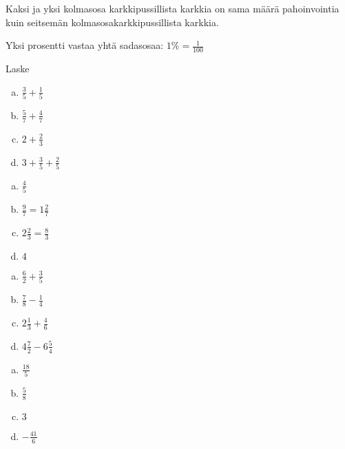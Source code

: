 
Kaksi ja yksi kolmasosa karkkipussillista karkkia on sama määrä pahoinvointia kuin seitsemän kolmasosakarkkipussillista karkkia.


Yksi prosentti vastaa yhtä sadasosaa: $1 \% = \frac{1}{100}$

Laske %

\begin{tehtava}
    \begin{enumerate}[a)]
	\item $\frac{3}{5} + \frac{1}{5}$
	\item $\frac{5}{7} + \frac{4}{7}$
	\item $2 + \frac{2}{3}$
	\item$3 + \frac{3}{5} + \frac{2}{5}$   
    \end{enumerate}
    \begin{vastaus}
		\begin{enumerate}[a)]
			\item $\frac{4}{5}$
			\item $\frac{9}{7} = 1 \frac{2}{7}$
			\item $2 \frac{2}{3} = \frac{8}{3}$
			\item $4$
		\end{enumerate}
    \end{vastaus}
\end{tehtava}

\begin{tehtava}

\begin{enumerate}[a)]
	\item $\frac{6}{2} + \frac{3}{5}$
	\item $\frac{7}{8} - \frac{1}{4}$
	\item $2 \frac{1}{3} + \frac{4}{6}$
	\item $4 \frac{7}{2} - 6 \frac{5}{4}$
\end{enumerate}
    \begin{vastaus}		
		\begin{enumerate}[a)]
			\item $\frac{18}{5}$
			\item $\frac{5}{8}$
			\item $3$
			\item $-\frac{41}{6}$ 
		\end{enumerate}
    \end{vastaus}
\end{tehtava}

